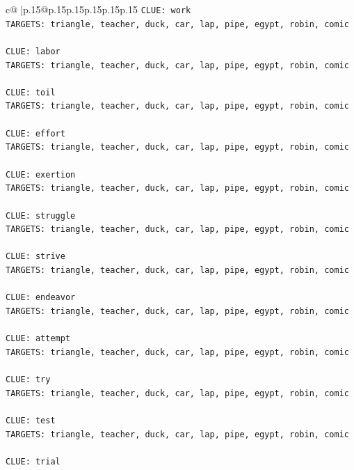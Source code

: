 \documentclass{article}
\begin{document}
{\begin{supertabular}{c@{$\;$}|p{.15\linewidth}@{}p{.15\linewidth}p{.15\linewidth}p{.15\linewidth}p{.15\linewidth}p{.15\linewidth}}
{{{\texttt{CLUE: work} \\
\texttt{TARGETS: triangle, teacher, duck, car, lap, pipe, egypt, robin, comic} \\
\\ 
\texttt{CLUE: labor} \\
\texttt{TARGETS: triangle, teacher, duck, car, lap, pipe, egypt, robin, comic} \\
\\ 
\texttt{CLUE: toil} \\
\texttt{TARGETS: triangle, teacher, duck, car, lap, pipe, egypt, robin, comic} \\
\\ 
\texttt{CLUE: effort} \\
\texttt{TARGETS: triangle, teacher, duck, car, lap, pipe, egypt, robin, comic} \\
\\ 
\texttt{CLUE: exertion} \\
\texttt{TARGETS: triangle, teacher, duck, car, lap, pipe, egypt, robin, comic} \\
\\ 
\texttt{CLUE: struggle} \\
\texttt{TARGETS: triangle, teacher, duck, car, lap, pipe, egypt, robin, comic} \\
\\ 
\texttt{CLUE: strive} \\
\texttt{TARGETS: triangle, teacher, duck, car, lap, pipe, egypt, robin, comic} \\
\\ 
\texttt{CLUE: endeavor} \\
\texttt{TARGETS: triangle, teacher, duck, car, lap, pipe, egypt, robin, comic} \\
\\ 
\texttt{CLUE: attempt} \\
\texttt{TARGETS: triangle, teacher, duck, car, lap, pipe, egypt, robin, comic} \\
\\ 
\texttt{CLUE: try} \\
\texttt{TARGETS: triangle, teacher, duck, car, lap, pipe, egypt, robin, comic} \\
\\ 
\texttt{CLUE: test} \\
\texttt{TARGETS: triangle, teacher, duck, car, lap, pipe, egypt, robin, comic} \\
\\ 
\texttt{CLUE: trial} \\
}}}
\end{supertabular}}
\end{document}
